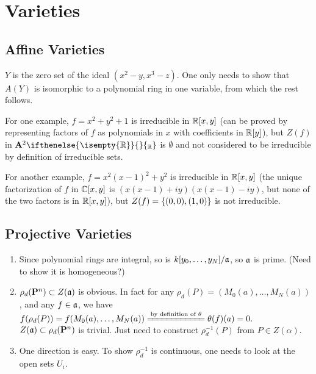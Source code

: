 \documentclass{note}
\newcommand{\Affine}[2][]{\mathbf{A}^{#2}\ifthenelse{\isempty{#1}}{}{_{#1}}}
\newcommand{\Proj}[1]{\mathbf{P}^{#1}}
\begin{document}
\chapter{Varieties}

\section{Affine Varieties}

\setcounter{exercise}{1}
\Ex
$Y$ is the zero set of the ideal $(x^2-y,x^3-z)$. One only needs to
show that $A(Y)$ is isomorphic to a polynomial ring in one variable, from which
the rest follows.

\setcounter{exercise}{11}
\Ex
For one example, $f = x^2 + y^2 + 1$ is irreducible in
$\polynomials{\reals}{x}{y}$ (can be proved by representing factors of $f$ as
polynomials in $x$ with coefficients in $\polynomials{\reals}{y}$), but $Z(f)$
in $\Affine[\reals]{2}$ is $\emptyset$ and not considered to be irreducible by
definition of irreducible sets.

For another example, $f = x^2(x-1)^2 + y^2$ is irreducible in
$\polynomials{\reals}{x}{y}$ (the unique factorization of $f$ in
$\polynomials{\complexes}{x}{y}$ is $(x(x-1) + iy)(x(x-1) - iy)$, but none of
the two factors is in $\polynomials{\reals}{x}{y}$), but $Z(f) = \set{(0,
    0)}{(1, 0)}$ is not irreducible.

\section{Projective Varieties}

\setcounter{exercise}{11}
\Ex
\begin{enumerate}
  \item Since polynomial rings are integral, so is
        $\polynomials{k}{y_0}{\dots}{y_N}/\ideal{a}$, so $\mathfrak{a}$ is prime. (Need
        to show it is homogeneous?)
  \item $\rho_d(\Proj{n})\subset Z(\ideal{a})$ is
        obvious. In fact for any $\rho_d(P)=(M_0(a),\dots,M_N(a))$, and any
        $f\in\mathfrak{a}$, we have $f(\rho_d(P)) = f(M_0(a),\dots,M_N(a))
          \xlongequal{\text{by definition of }\theta} \theta(f)(a) = 0.$\\
        $Z(\ideal{a})\subset\rho_d(\Proj{n})$ is trivial. Just need to construct
        $\rho_d^{-1}(P)$ from $P\in Z(\alpha)$.
  \item One direction is easy. To show
        $\rho_d^{-1}$ is continuous, one needs to look at the open sets $U_i$.
\end{enumerate}
\end{document}
